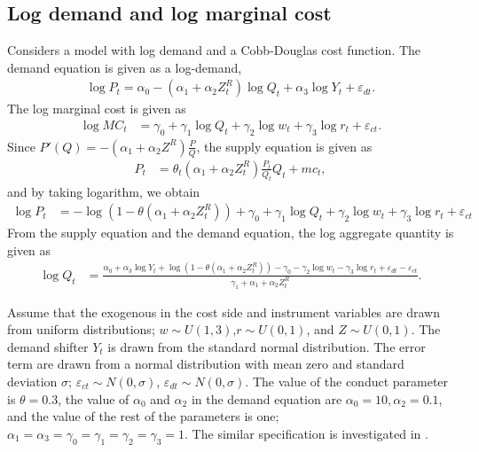 \documentclass[11pt, a4paper]{article}
\begin{document}
\subsection{Log demand and log marginal cost}

Considers a model with log demand and a Cobb-Douglas cost function. 
The demand equation is given as a log-demand, 
\begin{align}
    \log P_{t} = \alpha_0 - (\alpha_1 + \alpha_2 Z^R_t) \log Q_t + \alpha_3 \log Y_t + \varepsilon_{dt}.
\end{align}
The log marginal cost is given as 
\begin{align}
    \log MC_t &= \gamma_0 + \gamma_1 \log Q_t +  \gamma_2 \log w_t + \gamma_3 \log r_t + \varepsilon_{ct}.
\end{align}
Since $P'(Q) = - (\alpha_1 + \alpha_2 Z^R) \frac{P}{Q} $, the supply equation is given as
\begin{align}
    P_t &= \theta_t (\alpha_1 + \alpha_2 Z^R_t) \frac{P_t}{Q_t} Q_t + mc_t,
\end{align}
and by taking logarithm, we obtain
\begin{align}
    \log P_t & = - \log(1 - \theta(\alpha_1 + \alpha_2 Z^R_t)) + \gamma_0 + \gamma_1 \log Q_t +  \gamma_2 \log w_t + \gamma_3 \log r_t + \varepsilon_{ct}
\end{align}
From the supply equation and the demand equation, the log aggregate quantity is given as 
\begin{align}
    \log Q_t &= \frac{ \alpha_0 + \alpha_3 \log Y_t + \log (1 - \theta (\alpha_1 + \alpha_2 Z^R_t)) - \gamma_0  -  \gamma_2 \log w_t - \gamma_3 \log r_t + \varepsilon_{dt} - \varepsilon_{ct}}{\gamma_1+ \alpha_1 + \alpha_2 Z^R_t }.
\end{align}

Assume that the exogenous in the cost side and instrument variables are drawn from uniform distributions; $w \sim U(1,3)$,$r \sim U(0,1)$, and $Z \sim U(0, 1)$. 
The demand shifter $Y_t$ is drawn from the standard normal distribution.
The error term are drawn from a normal distribution with mean zero and standard deviation $\sigma$; $\varepsilon_{ct}\sim N(0,\sigma)$, $\varepsilon_{dt} \sim N(0,\sigma)$.
The value of the conduct parameter is $\theta = 0.3$, the value of $\alpha_0$ and $\alpha_2$ in the demand equation are $\alpha_0 = 10, \alpha_2 = 0.1$, and the value of the rest of the parameters is one; $\alpha_1 = \alpha_3 = \gamma_0 = \gamma_1 = \gamma_2  = \gamma_3 = 1$.
The similar specification is investigated in \cite{hyde1995can}.
\end{document}
